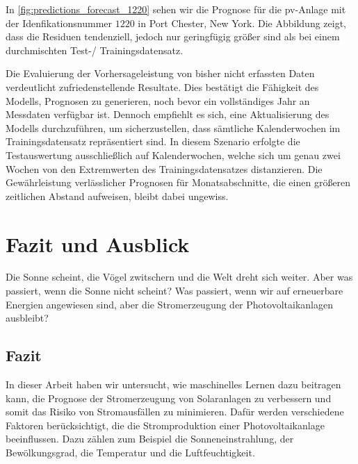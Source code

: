 \documentclass[12pt, a4paper]{article}
\begin{document}
In \autoref{fig:predictions_forecast_1220} sehen wir die Prognose für die \ac{pv}-Anlage mit der Idenfikationsnummer $1220$ in Port Chester, New York. Die Abbildung zeigt, dass die Residuen tendenziell, jedoch nur geringfügig größer sind als bei einem durchmischten Test-/ Trainingsdatensatz.

Die Evaluierung der Vorhersageleistung von bisher nicht erfassten Daten verdeutlicht zufriedenstellende Resultate. Dies bestätigt die Fähigkeit des Modells, Prognosen zu generieren, noch bevor ein vollständiges Jahr an Messdaten verfügbar ist. Dennoch empfiehlt es sich, eine Aktualisierung des Modells durchzuführen, um sicherzustellen, dass sämtliche Kalenderwochen im Trainingsdatensatz repräsentiert sind. In diesem Szenario erfolgte die Testauswertung ausschließlich auf Kalenderwochen, welche sich um genau zwei Wochen von den Extremwerten des Trainingsdatensatzes distanzieren. Die Gewährleistung verlässlicher Prognosen für Monatsabschnitte, die einen größeren zeitlichen Abstand aufweisen, bleibt dabei ungewiss.


\newpage

\section{Fazit und Ausblick}
\label{sec:conclusion_outlook}

Die Sonne scheint, die Vögel zwitschern und die Welt dreht sich weiter. Aber was passiert, wenn die Sonne nicht scheint? Was passiert, wenn wir auf erneuerbare Energien angewiesen sind, aber die Stromerzeugung der Photovoltaikanlagen ausbleibt? 

\subsection{Fazit}

In dieser Arbeit haben wir untersucht, wie maschinelles Lernen dazu beitragen kann, die Prognose der Stromerzeugung von Solaranlagen zu verbessern und somit das Risiko von Stromausfällen zu minimieren. Dafür werden verschiedene Faktoren berücksichtigt, die die Stromproduktion einer Photovoltaikanlage beeinflussen. Dazu zählen zum Beispiel die Sonneneinstrahlung, der Bewölkungsgrad, die Temperatur und die Luftfeuchtigkeit.
\end{document}
